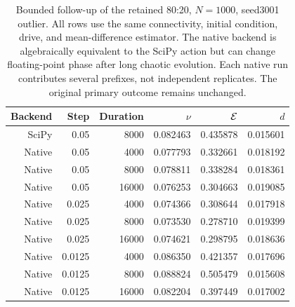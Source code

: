 \begin{table}[htp]
\centering
\small
\caption{Bounded follow-up of the retained 80:20, $N=1000$, seed3001
outlier. All rows use the same connectivity, initial condition, drive, and
mean-difference estimator. The native backend is algebraically equivalent
to the SciPy action but can change floating-point phase after long chaotic
evolution. Each native run contributes several prefixes, not independent
replicates. The original primary outcome remains unchanged.}
\label{tab:outlier_followup}
\begin{tabular}{rrrrrr}
\toprule
Backend&Step&Duration&$\nu$&$\mathcal E$&$d$\\
\midrule
SciPy&0.05&8000&0.082463&0.435878&0.015601\\
Native&0.05&4000&0.077793&0.332661&0.018192\\
Native&0.05&8000&0.078811&0.338284&0.018361\\
Native&0.05&16000&0.076253&0.304663&0.019085\\
Native&0.025&4000&0.074366&0.308644&0.017918\\
Native&0.025&8000&0.073530&0.278710&0.019399\\
Native&0.025&16000&0.074621&0.298795&0.018636\\
Native&0.0125&4000&0.086350&0.421357&0.017696\\
Native&0.0125&8000&0.088824&0.505479&0.015608\\
Native&0.0125&16000&0.082204&0.397449&0.017002\\
\bottomrule
\end{tabular}
\end{table}
